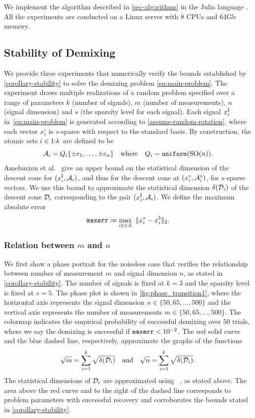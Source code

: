 We implement the algorithm described in \autoref{sec-algorithms} in the Julia language \cite{BEKS14}. All the experiments are conducted on a Linux server with 8 CPUs and 64Gb memory.

\subsection{Stability of Demixing} \label{sec:6.1}

We provide three experiments that numerically verify the bounds established by \autoref{corollary-stability} to solve the demixing problem \eqref{eq:main-problem}. The experiment draws multiple realizations of a random problem specified over a range of parameters $k$ (number of signals), $m$ (number of measurements), $n$ (signal dimension) and $s$ (the sparsity level for each signal). Each signal $x_i^{\natural}$ in~\eqref{eq:main-problem} is generated according to \autoref{assume-random-rotation}, where each vector $x_i^\circ$ is $s$-sparse with respect to the standard basis. By construction, the atomic sets $i\in1\mathord{:}k$ are defined to be 
\[
  \mathcal{A}_i = Q_i \{\pm e_1, \dots, \pm e_n\}\hbox{\quad where\quad} Q_i\sim\operatorname{\texttt{uniform}}(\operatorname{SO}(n)).
\]
Amelunxen et al.~\cite[Proposition~4.5]{amelunxen2014living} give an upper bound on the statistical dimension of the descent cone for $(x_i^{\natural},\mathcal{A}_i)$, and thus for the descent cone at $(x_i^\circ,\mathcal{A}_i^\circ)$, for  $s$-sparse vectors. We use this bound to approximate the statistical dimension $\delta(\mathcal{D}_i)$ of the descent cone $\mathcal{D}_i$ corresponding to the pair $(x_i^{\natural},\mathcal{A}_i)$.  We define the maximum absolute error
\begin{equation} \label{eq:rela_diff}
  \mathop{\tt maxerr}\coloneqq \max_{i\in\irange1k}\ \twonorm{x_i^*-x\nai}.
\end{equation}

\subsubsection{Relation between $m$ and $n$} \label{sec:phase_transition1}
We first show a phase portrait for the noiseless case that verifies the relationship between number of measurement $m$ and signal dimension $n$, as stated in \autoref{corollary-stability}. The number of signals is fixed at $k=3$ and the sparsity level is fixed at $s=5$. The phase plot is shown in \autoref{fig:phase_transition1}, where the horizontal axis represents the signal dimension $n\in\{50, 65, \dots, 500\}$ and the vertical axis represents the number of measurements $m\in\{50, 65, \dots, 500\}$. The colormap indicates the empirical probability of successful demixing over 50 trials, where we say the demixing is successful if $\mathop{\tt maxerr} < 10^{-2}$. The red solid curve and the blue dashed line, respectively, approximate the graphs of the functions
\[\sqrt{m} = \sum_{i=1}^k \sqrt{\delta(\mathcal{D}_i)}\hbox{\quad and\quad}\sqrt{n} = \sum_{i=1}^k \sqrt{\delta(\mathcal{D}_i)}.\]
The statistical dimensions of $\mathcal{D}_i$ are approximated using ~\cite[Proposition~4.5]{amelunxen2014living}, as stated above. The area above the red curve and to the right of the dashed line corresponds to problem parameters with successful recovery and corroborates the bounds stated in \autoref{corollary-stability}.

